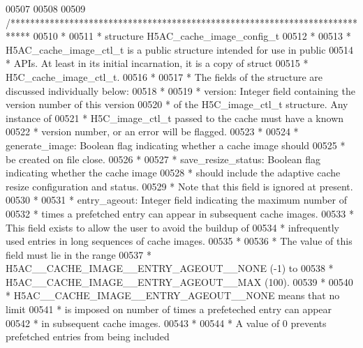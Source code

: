 \begin{DoxyCode}
00507 
00508 
00509 \textcolor{comment}{/****************************************************************************}
00510 \textcolor{comment}{ *}
00511 \textcolor{comment}{ * structure H5AC\_cache\_image\_config\_t}
00512 \textcolor{comment}{ *}
00513 \textcolor{comment}{ * H5AC\_cache\_image\_ctl\_t is a public structure intended for use in public }
00514 \textcolor{comment}{ * APIs.  At least in its initial incarnation, it is a copy of struct}
00515 \textcolor{comment}{ * H5C\_cache\_image\_ctl\_t.}
00516 \textcolor{comment}{ *}
00517 \textcolor{comment}{ * The fields of the structure are discussed individually below:}
00518 \textcolor{comment}{ *}
00519 \textcolor{comment}{ * version: Integer field containing the version number of this version}
00520 \textcolor{comment}{ *      of the H5C\_image\_ctl\_t structure.  Any instance of}
00521 \textcolor{comment}{ *      H5C\_image\_ctl\_t passed to the cache must have a known}
00522 \textcolor{comment}{ *      version number, or an error will be flagged.}
00523 \textcolor{comment}{ *}
00524 \textcolor{comment}{ * generate\_image:  Boolean flag indicating whether a cache image should}
00525 \textcolor{comment}{ *      be created on file close.}
00526 \textcolor{comment}{ *}
00527 \textcolor{comment}{ * save\_resize\_status:  Boolean flag indicating whether the cache image }
00528 \textcolor{comment}{ *  should include the adaptive cache resize configuration and status.}
00529 \textcolor{comment}{ *  Note that this field is ignored at present.}
00530 \textcolor{comment}{ *}
00531 \textcolor{comment}{ * entry\_ageout:    Integer field indicating the maximum number of }
00532 \textcolor{comment}{ *  times a prefetched entry can appear in subsequent cache images.}
00533 \textcolor{comment}{ *  This field exists to allow the user to avoid the buildup of }
00534 \textcolor{comment}{ *  infrequently used entries in long sequences of cache images.}
00535 \textcolor{comment}{ *}
00536 \textcolor{comment}{ *  The value of this field must lie in the range}
00537 \textcolor{comment}{ *  H5AC\_\_CACHE\_IMAGE\_\_ENTRY\_AGEOUT\_\_NONE (-1) to }
00538 \textcolor{comment}{ *  H5AC\_\_CACHE\_IMAGE\_\_ENTRY\_AGEOUT\_\_MAX (100).}
00539 \textcolor{comment}{ *}
00540 \textcolor{comment}{ *  H5AC\_\_CACHE\_IMAGE\_\_ENTRY\_AGEOUT\_\_NONE means that no limit }
00541 \textcolor{comment}{ *  is imposed on number of times a prefeteched entry can appear}
00542 \textcolor{comment}{ *  in subsequent cache images.}
00543 \textcolor{comment}{ *}
00544 \textcolor{comment}{ *  A value of 0 prevents prefetched entries from being included }

\end{DoxyCode}
